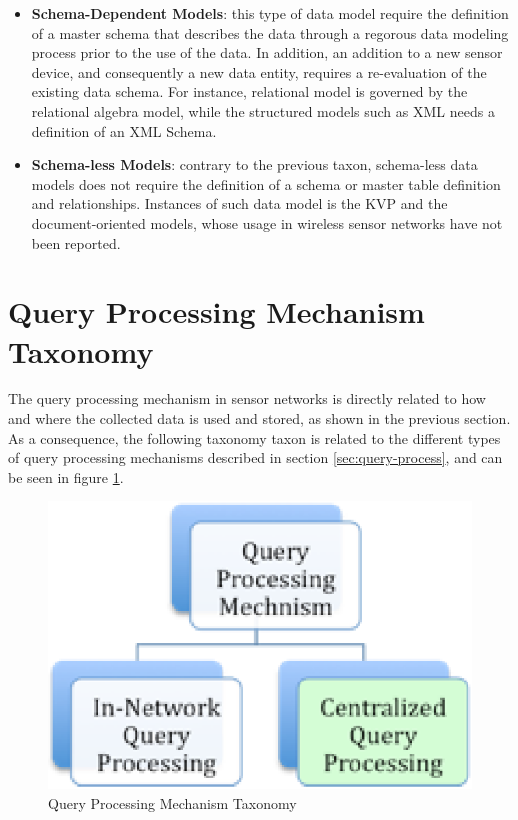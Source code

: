 \begin{itemize}
  \item \textbf{Schema-Dependent Models}: this type of data model require
  the definition of a master schema that describes the data through a regorous
  data modeling process prior to the use of the data. In addition, an addition
 to a new sensor device, and consequently a new data entity, requires a
 re-evaluation of the existing data schema. For instance, relational model is
 governed by the relational algebra model, while the structured models such as
 XML needs a definition of an XML Schema.
  \item \textbf{Schema-less Models}: contrary to the previous taxon, 
  schema-less data models does not require the definition of a schema or master
  table definition and relationships. Instances of such data model is the KVP
  and the document-oriented models, whose usage in wireless sensor networks
  have not been reported.
\end{itemize}

\section{Query Processing Mechanism Taxonomy}

The query processing mechanism in sensor networks is directly related to how
and where the collected data is used and stored, as shown in the previous
section. As a consequence, the following taxonomy taxon is related to the
different types of query processing mechanisms described in section
\ref{sec:query-process}, and can be seen in figure
\ref{fig:taxonomy-query-mechanism}.

\begin{figure}[h]
  \centering
  \includegraphics{../diagrams/taxonomy-query-mechanism}
  \caption{Query Processing Mechanism Taxonomy}
  \label{fig:taxonomy-query-mechanism}
\end{figure}

